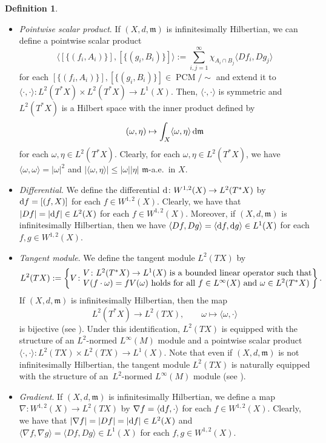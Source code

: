 \documentclass[10pt,a4paper]{amsart}
\numberwithin{equation}{section}
\theoremstyle{definition}
\newtheorem{Def}[Thm]{Definition}
\newcommand{\PCM}{\operatorname{PCM}}
\newcommand{\mf}{\mathfrak{m}}
\begin{document}
\begin{Def}
\begin{itemize}
In general, $L^2(T^\ast X)$ does not need to be a Hilbert space, and $L^2(T^\ast X)$ is a Hilbert space if and only if $(X,d,\mf)$ is infinitesimally Hilbertian \cite[Proposition~2.3.17]{Gig}.
\item \emph{Pointwise scalar product}. If $(X,d,\mf)$ is infinitesimally Hilbertian, we can define a pointwise scalar product
\[
\langle[\{(f_i,A_i)\}],[\{(g_i,B_i)\}]\rangle:=\sum_{i,j=1}^\infty \chi_{A_i\cap B_j}\langle D f_i,D g_j\rangle
\]
for each $[\{(f_i,A_i)\}],[\{(g_i,B_i)\}]\in\PCM/{\sim}$ and extend it to $\langle\cdot,\cdot\rangle\colon L^2(T^\ast X)\times L^2(T^\ast X)\to L^1(X)$.
Then, $\langle\cdot,\cdot\rangle$ is symmetric and $L^2(T^\ast X)$ is a Hilbert space with the inner product defined by
\[
(\omega,\eta)\mapsto \int_X \langle\omega,\eta\rangle\,{\rm d}\mf
\]
for each $\omega,\eta\in L^2(T^\ast X)$.
Clearly, for each $\omega,\eta\in L^2(T^\ast X)$, we have $\langle \omega,\omega\rangle=|\omega|^2$ and $|\langle\omega,\eta\rangle|\leq |\omega||\eta|$ $\mf$-a.e.\ in $X$.
\item \emph{Differential}. We define the differential ${\rm d}\colon W^{1,2}(X)\to L^2(T^\ast X)$ by ${\rm d} f=[(f,X)]$ for each $f\in W^{1,2}(X)$. Clearly, we have that $|D f|=|{\rm d} f|\in L^2(X)$ for each $f\in W^{1,2}(X)$.
Moreover, if $(X,d,\mf)$ is infinitesimally Hilbertian, then we have $\langle D f,D g\rangle=\langle {\rm d} f , {\rm d} g\rangle\in L^1(X)$ for each $f,g\in W^{1,2}(X)$.
\item \emph{Tangent module}. We define the tangent module $L^2(T X)$ by
\[
L^2(T X):=\left\{V\colon \begin{array}{@{}l@{}}\text{$V\colon L^2(T^\ast X)\to L^1(X)$ is a bounded linear operator such that}\\
\text{$V(f\cdot \omega)=f V(\omega)$ holds for all $f\in L^\infty(X)$ and $\omega\in L^2(T^\ast X)$}
\end{array} \right\} .
\]
If $(X,d,\mf)$ is infinitesimally Hilbertian, then the map
\[
L^2(T^\ast X)\to L^2(T X),\qquad\omega\mapsto \langle\omega,\cdot\rangle
\]
is bijective (see \cite[Theorem~1.2.24]{Gig}).
Under this identification, $L^2(T X)$ is equipped with the structure of an $L^2$-normed $L^\infty(M)$ module and a pointwise scalar product $\langle\cdot,\cdot\rangle\colon L^2(T X)\times L^2(T X)\to L^1(X)$.
Note that even if $(X,d,\mf)$ is not infinitesimally Hilbertian, the tangent module $L^2(T X)$ is naturally equipped with the structure of an~$L^2$-normed $L^\infty(M)$ module (see \cite[Definition~1.2.6 and~Proposition~1.2.14]{Gig}).
\item \emph{Gradient}. If $(X,d,\mf)$ is infinitesimally Hilbertian, we define a map $\nabla\colon W^{1,2}(X)\to L^2(T X)$ by $\nabla f=\langle {\rm d} f,\cdot\rangle$ for each $f\in W^{1,2}(X)$. Clearly, we have that $|\nabla f|=|D f|=|{\rm d} f|\in L^2(X)$ and $\langle\nabla f,\nabla g\rangle=\langle D f, D g\rangle\in L^1(X)$ for each $f,g \in W^{1,2}(X)$.

\end{itemize}
\end{Def}
\end{document}
